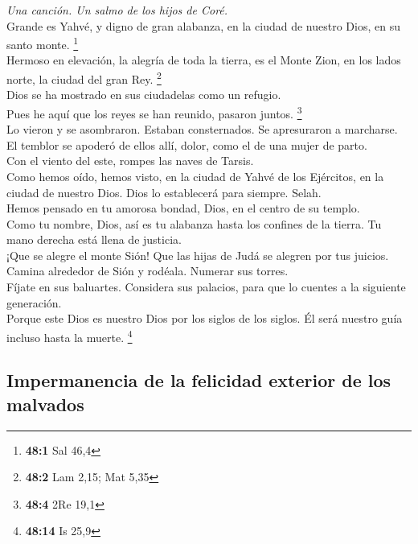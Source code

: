 \emph{Una canción. Un salmo de los hijos de Coré.}\\
 Grande es Yahvé, y digno de gran alabanza, en la ciudad
de nuestro Dios, en su santo monte. \footnote{\textbf{48:1} Sal 46,4}\\
 Hermoso en elevación, la alegría de toda la tierra, es el
Monte Zion, en los lados norte, la ciudad del gran Rey. \footnote{\textbf{48:2}
  Lam 2,15; Mat 5,35}\\
 Dios se ha mostrado en sus ciudadelas como un refugio.\\
 Pues he aquí que los reyes se han reunido, pasaron
juntos. \footnote{\textbf{48:4} 2Re 19,1}\\
 Lo vieron y se asombraron. Estaban consternados. Se
apresuraron a marcharse.\\
 El temblor se apoderó de ellos allí, dolor, como el de
una mujer de parto.\\
 Con el viento del este, rompes las naves de Tarsis.\\
 Como hemos oído, hemos visto, en la ciudad de Yahvé de
los Ejércitos, en la ciudad de nuestro Dios. Dios lo establecerá para
siempre. Selah.\\
 Hemos pensado en tu amorosa bondad, Dios, en el centro de
su templo.\\
 Como tu nombre, Dios, así es tu alabanza hasta los
confines de la tierra. Tu mano derecha está llena de justicia.\\
 ¡Que se alegre el monte Sión! Que las hijas de Judá se
alegren por tus juicios.\\
 Camina alrededor de Sión y rodéala. Numerar sus
torres.\\
 Fíjate en sus baluartes. Considera sus palacios, para
que lo cuentes a la siguiente generación.\\
 Porque este Dios es nuestro Dios por los siglos de los
siglos. Él será nuestro guía incluso hasta la muerte. \footnote{\textbf{48:14}
  Is 25,9}

\hypertarget{impermanencia-de-la-felicidad-exterior-de-los-malvados}{%
\subsection{Impermanencia de la felicidad exterior de los
malvados}\label{impermanencia-de-la-felicidad-exterior-de-los-malvados}}

